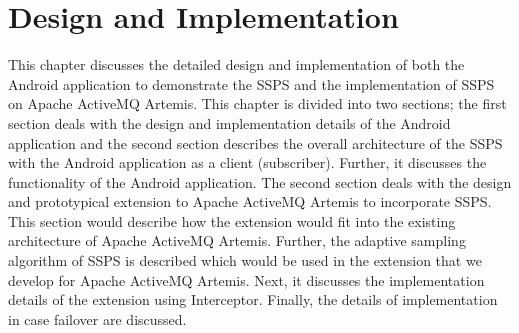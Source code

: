 \chapter{Design and Implementation}\label{chapter:design_implementation}

This chapter discusses the detailed design and implementation of both the Android application to demonstrate the SSPS and the implementation of SSPS on Apache ActiveMQ Artemis. This chapter is divided into two sections; the first section deals with the design and implementation details of the Android application and the second section describes the overall architecture of the SSPS with the Android application as a client (subscriber). Further, it discusses the functionality of the Android application. The second section deals with the design and prototypical extension to Apache ActiveMQ Artemis to incorporate SSPS. This section would describe how the extension would fit into the existing architecture of Apache ActiveMQ Artemis. Further, the adaptive sampling algorithm of SSPS is described which would be used in the extension that we develop for Apache ActiveMQ Artemis. Next, it discusses the implementation details of the extension using Interceptor. Finally, the details of implementation in case failover are discussed.